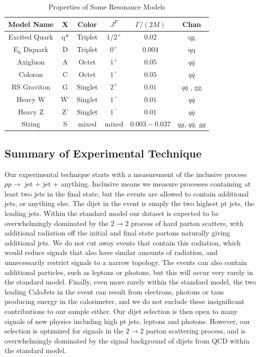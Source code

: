\begin{table}[th]
\centering
\normalsize
       \begin{tabular}{|c|c|c|c|c|c|}
        \hline
        Model Name 	& X & Color 	& $J^{P}$ 	& $\Gamma /(2M)$ & Chan		\\
        \hline
	Excited Quark 	& q*& Triplet 	& $1/2^+$ 	& $0.02$ 	& qg		\\
        E$_{6}$ Diquark & D & Triplet 	& $0^+$ 	& $0.004$ 	& qq		\\
        Axigluon 	& A & Octet 	& $1^+$ 	& $0.05$ 	& $q\bar{q}$	\\
        Coloron 	& C & Octet 	& $1^-$ 	& $0.05$ 	& $q\bar{q}$	\\
        RS Graviton 	& G & Singlet 	& $2^+$ 	& $0.01$ 	& $q\bar{q}$ , gg	\\
        Heavy W 	& W'& Singlet 	& $1^-$ 	& $0.01$ 	& $q\bar{q}$	\\
        Heavy Z 	& Z'& Singlet 	& $1^-$ 	& $0.01$ 	& $q\bar{q}$	\\
	String          & S & mixed     & mixed         & $0.003-0.037$  & $qg$, $q\bar{q}$, $gg$ \\
        \hline
        \end{tabular}
 	\caption{Properties of Some Resonance Models}
	\label{table:models}
	\end{table}



\subsection{Summary of Experimental Technique}
Our experimental technique starts with a measurement of the 
inclusive process $pp \rightarrow$ jet + jet + anything.  Inclusive means we
measure processes containing at least two jets in the final state, but the 
events are allowed to contain additional jets, or anything else.
The dijet in the event is simply the two highest pt jets, the leading jets.
Within the standard model our dataset is expected to be overwhelmingly
dominated by the $2\rightarrow 2$ process of hard parton scatters, with 
additional radiation off the initial
and final state partons naturally giving additional jets. We do not cut
away events that contain this radiation, which would reduce signals that 
also have similar amounts of radiation, 
and unnecessarily restrict signals to a narrow topology.  The 
events can also contain additional particles, such as leptons or photons, 
but this will occur very rarely in the standard model.  Finally, even more
rarely within the standard model, the two leading CaloJets in the event can
result from electrons, photons or taus producing energy in the calorimeter,
and we do not exclude these insignificant contributions to our sample either.  
Our dijet selection is then open to many signals of new physics including 
high pt jets, leptons and photons. However, our selection is optimized for 
signals in the $2\rightarrow 2$ parton scattering process, and is
overwhelmingly dominated by the signal background of dijets from QCD within 
the standard model.


